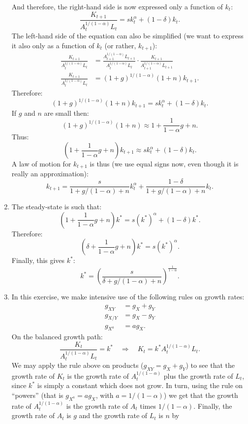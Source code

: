\documentclass[]{book}
\theoremstyle{definition}
\theoremstyle{definition}
\theoremstyle{definition}
\theoremstyle{remark}
\begin{document}
\begin{enumerate}
  And therefore, the right-hand side is now expressed only a function of
  \(k_t\):
  \[\frac{K_{t+1}}{A_t^{1/(1-\alpha)} L_t}=sk_t^\alpha+(1-\delta)k_t.\]
  The left-hand side of the equation can also be simplified (we want to
  express it also only as a function of \(k_t\) (or rather,
  \(k_{t+1}\)): \[
  \begin{aligned}
  \frac{K_{t+1}}{A_t^{1/(1-\alpha)} L_t}&= \frac{A_{t+1}^{1/(1-\alpha)} L_{t+1}}{A_t^{1/(1-\alpha)} L_t} \cdot \frac{K_{t+1}}{A_{t+1}^{1/(1-\alpha)} L_{t+1}} \\
  \frac{K_{t+1}}{A_t^{1/(1-\alpha)} L_t}&=(1+g)^{1/(1-\alpha)}(1+n) k_{t+1}.
  \end{aligned}
  \] Therefore:
  \[(1+g)^{1/(1-\alpha)}(1+n) k_{t+1} =sk_t^\alpha+(1-\delta)k_t.\] If
  \(g\) and \(n\) are small then:
  \[(1+g)^{1/(1-\alpha)}(1+n)\approx1+\frac{1}{1-\alpha}g+n.\] Thus:
  \[\left(1+\frac{1}{1-\alpha}g+n\right)k_{t+1}\approx s k_t^\alpha+(1-\delta)k_t.\]
  A law of motion for \(k_{t+1}\) is thus (we use equal signs now, even
  though it is really an approximation):
  \[\boxed{k_{t+1}=\frac{s}{1+g/(1-\alpha)+n}k_t^{\alpha}+\frac{1-\delta}{1+g/(1-\alpha)+n}k_t}.\]
\item
  The steady-state is such that:
  \[\left(1+\frac{1}{1-\alpha}g+n\right)k^{*} = s(k^{*})^\alpha + (1-\delta)k^{*}.\]
  Therefore:
  \[\left(\delta+\frac{1}{1-\alpha}g+n\right)k^{*} = s(k^{*})^\alpha.\]
  Finally, this gives \(k^{*}\):
  \[\boxed{k^{*}=\left(\frac{s}{\delta+g/(1-\alpha)+n}\right)^{\frac{1}{1-\alpha}}}.\]
\item
  In this exercise, we make intensive use of the following rules on
  growth rates: \[
  \begin{aligned}
  g_{XY}&=g_X+g_Y\\
  g_{X/Y}&=g_X-g_Y\\
  g_{X^a}&=ag_X.
  \end{aligned}
  \] On the balanced growth path:
  \[\frac{K_t}{A_t^{1/(1-\alpha)} L_t}=k^{*} \quad \Rightarrow \quad K_t = k^{*}A_t^{1/(1-\alpha)} L_t.\]
  We may apply the rule above on products (\(g_{XY}=g_X+g_Y\)) to see
  that the growth rate of \(K_t\) is the growth rate of
  \(A_t^{1/(1-\alpha)}\) plus the growth rate of \(L_t\), since
  \(k^{*}\) is simply a constant which does not grow. In turn, using the
  rule on ``powers'' (that is \(g_{X^a}=ag_X\), with \(a=1/(1-\alpha)\))
  we get that the growth rate of \(A_t^{1/(1-\alpha)}\) is the growth
  rate of \(A_t\) times \(1/(1-\alpha)\). Finally, the growth rate of
  \(A_t\) is \(g\) and the growth rate of \(L_t\) is \(n\) by

\end{enumerate}
\end{document}

